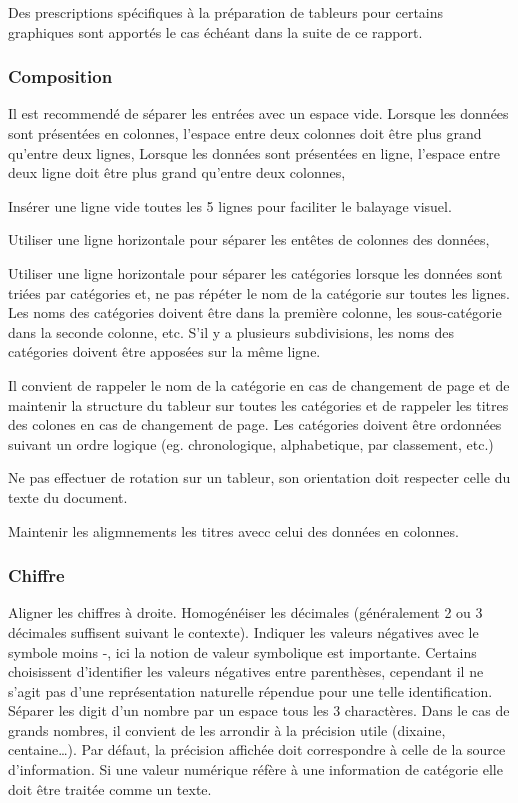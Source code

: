 \documentclass[a4paper,12pt]{article}
\begin{document}
\begin{multicols}{2}
Des prescriptions spécifiques à la préparation de tableurs pour certains graphiques sont apportés le cas échéant dans la suite de ce rapport.
\subsubsection*{Composition}
\label{sec:orgb4bbbbb}
Il est recommendé de séparer les entrées avec un espace vide.
Lorsque les données sont présentées en colonnes, l'espace entre deux colonnes doit être plus grand qu'entre deux lignes,
Lorsque les données sont présentées en ligne, l'espace entre deux ligne doit être plus grand qu'entre deux colonnes,

Insérer une ligne vide toutes les 5 lignes pour faciliter le balayage visuel. \autocite{NFENISO9241-125ErgonomieLinteractionHommesysteme2017}

Utiliser une ligne horizontale pour séparer les entêtes de colonnes des données,

Utiliser une ligne horizontale pour séparer les catégories lorsque les données sont triées par catégories et, ne pas répéter le nom de la catégorie sur toutes les lignes. Les noms des catégories doivent être dans la première colonne, les sous-catégorie dans la seconde colonne, etc. S'il y a plusieurs subdivisions, les noms des catégories doivent être apposées sur la même ligne.

Il convient de rappeler le nom de la catégorie en cas de changement de page et de maintenir la structure du tableur sur toutes les catégories et de rappeler les titres des colones en cas de changement de page.
Les catégories doivent être ordonnées suivant un ordre logique (eg. chronologique, alphabetique, par classement, etc.)

Ne pas effectuer de rotation sur un tableur, son orientation doit respecter celle du texte du document.

Maintenir les aligmnements les titres avecc celui des données en colonnes.
\subsubsection*{Chiffre}
\label{sec:org6998916}
Aligner les chiffres à droite.
Homogénéiser les décimales (généralement 2 ou 3 décimales suffisent suivant le contexte).
Indiquer les valeurs négatives avec le symbole moins \og -\fg{}, ici la notion de valeur symbolique est importante. Certains choisissent d'identifier les valeurs négatives entre parenthèses, cependant il ne s'agit pas d'une représentation naturelle répendue pour une telle identification.
Séparer les digit d'un nombre par un espace tous les 3 charactères. Dans le cas de grands nombres, il convient de les arrondir à la précision utile (dixaine, centaine\ldots{}). Par défaut, la précision affichée doit correspondre à celle de la source d'information.
Si une valeur numérique réfère à une information de catégorie elle doit être traitée comme un texte.


\end{multicols}
\end{document}
